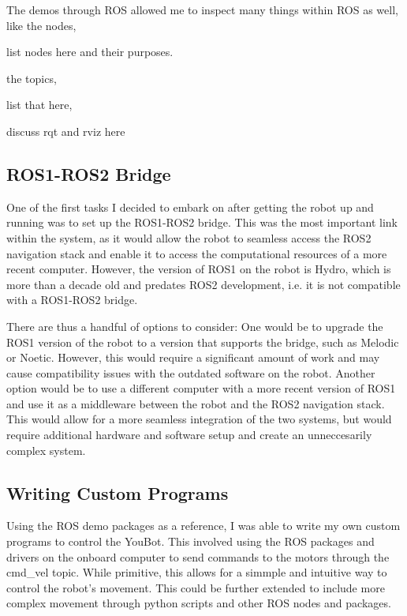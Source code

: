 \documentclass[a4paper, 12pt]{article}
\begin{document}
    The demos through ROS allowed me to inspect many things within ROS as well, like the nodes,

    list nodes here and their purposes.

    the topics,

    list that here,

    discuss rqt and rviz here

    \pagebreak

    \pagebreak
    \subsection{ROS1-ROS2 Bridge}

    One of the first tasks I decided to embark on after getting the robot up and running was to set up the ROS1-ROS2 bridge. This was the most important link within the system, as it would allow the robot to seamless access the ROS2 navigation stack and enable it to access the computational resources of a more recent computer. However, the version of ROS1 on the robot is Hydro, which is more than a decade old and predates ROS2 development, i.e. it is not compatible with a ROS1-ROS2 bridge. 

    There are thus a handful of options to consider: One would be to upgrade the ROS1 version of the robot to a version that supports the bridge, such as Melodic or Noetic. However, this would require a significant amount of work and may cause compatibility issues with the outdated software on the robot. Another option would be to use a different computer with a more recent version of ROS1 and use it as a middleware between the robot and the ROS2 navigation stack. This would allow for a more seamless integration of the two systems, but would require additional hardware and software setup and create an unneccesarily complex system. 

    \pagebreak

    \subsection{Writing Custom Programs}

    Using the ROS demo packages as a reference, I was able to write my own custom programs to control the YouBot. This involved using the ROS packages and drivers on the onboard computer to send commands to the motors through the \/cmd\_vel topic. While primitive, this allows for a simmple and intuitive way to control the robot's movement. This could be further extended to include more complex movement through python scripts and other ROS nodes and packages.
\end{document}
